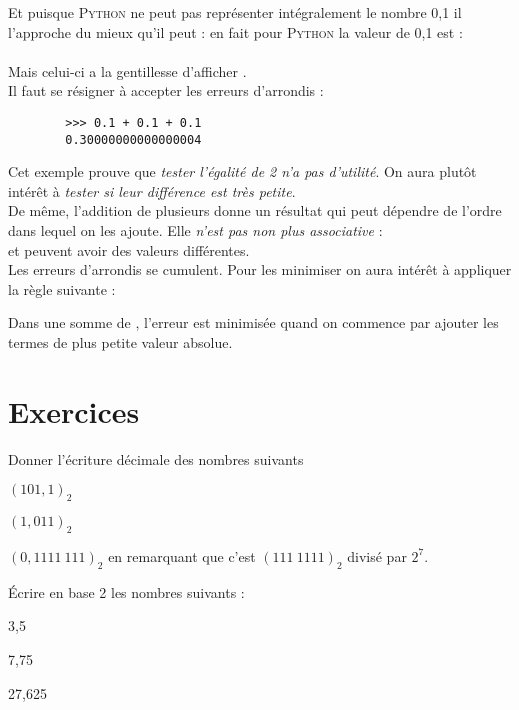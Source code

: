 Et puisque \textsc{Python} ne peut pas représenter intégralement le nombre 0,1 il l'approche du mieux qu'il peut : en fait pour \textsc{Python} la
valeur de 0,1 est :\\

\\

Mais celui-ci a la gentillesse d'afficher .\\

Il faut se résigner à accepter les erreurs d'arrondis :
\begin{pys}
    \begin{verbatim}
        >>> 0.1 + 0.1 + 0.1
        0.30000000000000004
    \end{verbatim}
\end{pys}

Cet exemple prouve que \textit{tester l'égalité de 2  n'a pas d'utilité}. On aura plutôt intérêt à \textit{tester si leur différence est
    très petite}.\\

De même, l'addition de plusieurs  donne un résultat qui peut dépendre de l'ordre dans lequel on les ajoute.
Elle \textit{n'est pas non plus associative} : \\

 et  peuvent avoir des valeurs différentes.\\


Les erreurs d'arrondis se cumulent. Pour les minimiser on aura intérêt à appliquer la règle suivante :

\begin{propriete}
    Dans une somme de , l'erreur est minimisée quand on commence par ajouter les termes de plus petite valeur absolue.
\end{propriete}

\section{Exercices}

\begin{exercice}[]
    Donner l'écriture décimale des nombres suivants\begin{enumalph}
        \item 	$(101,1)_2$
        \item 	$(1,011)_2$
        \item 	$(0,1111\ 111)_2$ en remarquant que c'est \og $(111\ 1111)_2$ divisé par $2^7$.
    \end{enumalph}
\end{exercice}
\begin{exercice}[]
    \'Ecrire en base 2 les nombres suivants :
    \begin{enumalph}
        \item 	3,5
        \item 	7,75
        \item 	27,625
    \end{enumalph}
\end{exercice}

